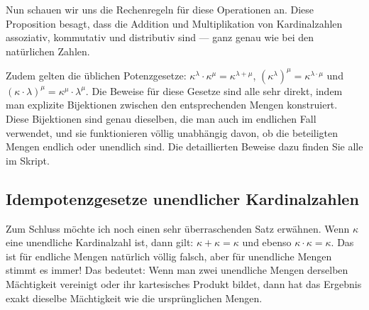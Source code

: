 \begin{spoken-clean}[01:18:55 - 01:20:55]
Nun schauen wir uns die Rechenregeln für diese Operationen an. Diese Proposition besagt, dass die Addition und Multiplikation von Kardinalzahlen assoziativ, kommutativ und distributiv sind --- ganz genau wie bei den natürlichen Zahlen.

Zudem gelten die üblichen Potenzgesetze: $\kappa^\lambda \cdot \kappa^\mu = \kappa^{\lambda + \mu}$, $(\kappa^\lambda)^\mu = \kappa^{\lambda \cdot \mu}$ und $(\kappa \cdot \lambda)^\mu = \kappa^\mu \cdot \lambda^\mu$. Die Beweise für diese Gesetze sind alle sehr direkt, indem man explizite Bijektionen zwischen den entsprechenden Mengen konstruiert. Diese Bijektionen sind genau dieselben, die man auch im endlichen Fall verwendet, und sie funktionieren völlig unabhängig davon, ob die beteiligten Mengen endlich oder unendlich sind. Die detaillierten Beweise dazu finden Sie alle im Skript.
\end{spoken-clean}

\begin{math-stroke}
\end{math-stroke}

\subsection{Idempotenzgesetze unendlicher Kardinalzahlen}

\begin{spoken-clean}[01:20:55 - 01:23:00]
Zum Schluss möchte ich noch einen sehr überraschenden Satz erwähnen. Wenn $\kappa$ eine unendliche Kardinalzahl ist, dann gilt: $\kappa + \kappa = \kappa$ und ebenso $\kappa \cdot \kappa = \kappa$. Das ist für endliche Mengen natürlich völlig falsch, aber für unendliche Mengen stimmt es immer! Das bedeutet: Wenn man zwei unendliche Mengen derselben Mächtigkeit vereinigt oder ihr kartesisches Produkt bildet, dann hat das Ergebnis exakt dieselbe Mächtigkeit wie die ursprünglichen Mengen.
\end{spoken-clean}

